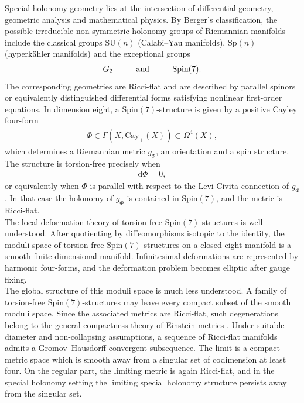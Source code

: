 \documentclass[psamsfonts]{amsart}
\theoremstyle{plain}
\theoremstyle{definition}{
\newtheorem{defi}{Definition}[section]
\newtheorem{ass}{Assumption}
\newtheorem*{nota}{Notation}}
\theoremstyle{remark}{
\newtheorem{rem}{Remark}
\newtheorem{ex}{Example}}
\theoremstyle{plain}{
\newtheorem{thm}{Theorem}[section]
\newtheorem{lem}{Lemma}[section]
\newtheorem{cor}{Corollary}[section]
\newtheorem{prop}{Proposition}[section]
\newtheorem{con}{Conjecture}[section]}
\newcommand{\m}[1]{{\mathrm{#1}}}
\newcommand{\und}[1]{\hspace{#1}\text{and}\hspace{#1}}
\begin{document}
Special holonomy geometry lies at the intersection of differential geometry, geometric analysis and mathematical physics. By Berger's classification, the possible irreducible non-symmetric holonomy groups of Riemannian manifolds include the classical groups $\m{SU}(n)$ (Calabi--Yau manifolds), $\m{Sp}(n)$ (hyperkähler manifolds) and the exceptional groups
\begin{align*}
G_2\und{1.0cm}\m{Spin}(7).
\end{align*}
The corresponding geometries are Ricci-flat and are described by parallel spinors or equivalently distinguished differential forms satisfying nonlinear first-order equations. In dimension eight, a $\m{Spin}(7)$-structure is given by a positive Cayley four-form
\begin{align*}
    \Phi \in \Gamma(X,\m{Cay}_+(X)) \subset \Omega^4(X),
\end{align*}
which determines a Riemannian metric $g_\Phi$, an orientation and a spin structure. The structure is torsion-free precisely when
\begin{align*}
    \m{d}\Phi = 0,
\end{align*}
or equivalently when $\Phi$ is parallel with respect to the Levi-Civita connection of $g_\Phi$. In that case the holonomy of $g_\Phi$ is contained in $\m{Spin}(7)$, and the metric is Ricci-flat.\\

The local deformation theory of torsion-free $\m{Spin}(7)$-structures is well understood. After quotienting by diffeomorphisms isotopic to the identity, the moduli space of torsion-free $\m{Spin}(7)$-structures on a closed eight-manifold is a smooth finite-dimensional manifold.\cite[Thm. D]{Joyce1996b} Infinitesimal deformations are represented by harmonic four-forms, and the deformation problem becomes elliptic after gauge fixing.\\

The global structure of this moduli space is much less understood. A family of torsion-free $\m{Spin}(7)$-structures may leave every compact subset of the smooth moduli space. Since the associated metrics are Ricci-flat, such degenerations belong to the general compactness theory of Einstein metrics \cite{anderson1990convergence,cheeger1986collapsing,cheeger1990collapsing,cheegernaber2015regularity,jiang2020l2curvatureboundsmanifolds}. Under suitable diameter and non-collapsing assumptions, a sequence of Ricci-flat manifolds admits a Gromov--Hausdorff convergent subsequence. The limit is a compact metric space which is smooth away from a singular set of codimension at least four. On the regular part, the limiting metric is again Ricci-flat, and in the special holonomy setting the limiting special holonomy structure persists away from the singular set.\\
\end{document}
